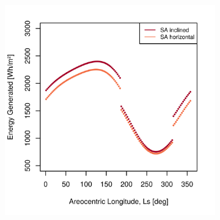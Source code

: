 \begin{figure}[h]
\captionsetup[subfigure]{justification=centering}
\vspace{-2ex}
	\centering
    \setlength{\subfigureWidth}{0.50\textwidth}
    \setlength{\graphicsHeight}{80mm}
    \hypersetup{hidelinks=true}%
    \begin{subfigure}[t]{\subfigureWidth}
        \centering
        \includegraphics[height=\graphicsHeight]{sections/power-system-design/solar-array/plots/ismeniuscavus-daily-generated-energy-for-solar-cell-coverage-area-41m2.png}
        \label{fig:plot:sub:ismenius-cavus-generated-energy}
    \end{subfigure}\hfill
    \begin{subfigure}[t]{\subfigureWidth}
        \centering

\end{subfigure}
\end{figure}
